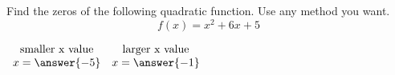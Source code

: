 \documentclass{ximera}
\author{David Kish}
\begin{document}
\begin{exercise}
Find the zeros of the following quadratic function. Use any method you want. 
\[
f(x) = x^2+6x + 5
\]

\begin{center}
$
\begin{array}{cc}
\text{smaller x value} & \text{larger x value}\\
x  = \answer{-5} & x = \answer{-1}
\end{array}
$
\end{center}
\end{exercise}
\end{document}

